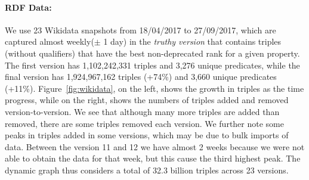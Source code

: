 \documentclass[runningheads]{llncs}
\begin{document}
\paragraph{RDF Data:} We use 23 Wikidata snapshots from 18/04/2017 to 27/09/2017, which are captured almost weekly($\pm$ 1 day) in the \emph{truthy version} that contains triples (without qualifiers) that have the best non-deprecated rank for a given property. The first version has 1,102,242,331 triples and 3,276 unique predicates, while the final version has 1,924,967,162 triples (+74\%) and 3,660 unique predicates (+11\%). Figure~\ref{fig:wikidata}, on the left, shows the growth in triples as the time progress, while on the right, shows the numbers of triples added and removed version-to-version. We see that although many more triples are added than removed, there are some triples removed each version. We further note some peaks in triples added in some versions, which may be due to bulk imports of data. Between the version 11 and 12 we have almost 2 weeks because we were not able to obtain the data for that week, but this cause the third highest peak. The dynamic graph thus considers a total of 32.3 billion triples across 23 versions.
\end{document}
